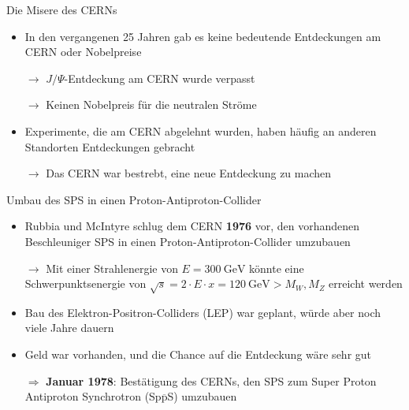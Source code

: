 \documentclass[aspectratio=1610, professionalfonts, 10pt]{beamer}
\begin{document}
\begin{frame}{Die Misere des CERNs}
				\begin{itemize}
					\setlength\itemsep{0.5em}
					\item In den vergangenen 25 Jahren gab es keine bedeutende Entdeckungen am CERN oder Nobelpreise
					\item[$\rightarrow$] $J/\Psi$-Entdeckung am CERN wurde verpasst
					\item[$\rightarrow$] Keinen Nobelpreis für die neutralen Ströme
					\item Experimente, die am CERN abgelehnt wurden, haben häufig an anderen Standorten Entdeckungen gebracht
				\end{itemize}
				\vspace*{10px}
				\begin{itemize}
					\item[$\rightarrow$] Das CERN war bestrebt, eine neue Entdeckung zu machen
				\end{itemize}
\end{frame}

\begin{frame}{Umbau des SPS in einen Proton-Antiproton-Collider}
				\begin{itemize}
					\setlength\itemsep{0.5em}
					\item Rubbia und McIntyre schlug dem CERN \textbf{1976} vor, den vorhandenen Beschleuniger SPS in einen Proton-Antiproton-Collider umzubauen
					\item[$\rightarrow$] Mit einer Strahlenergie von $E = \SI{300}{\giga\electronvolt}$ könnte eine Schwerpunktsenergie von $\sqrt{s} = 2 \cdot E \cdot x = \SI{120}{\giga\electronvolt} > M_W, M_Z$ erreicht werden
					\item Bau des Elektron-Positron-Colliders (LEP) war geplant, würde aber noch viele Jahre dauern
					\item Geld war vorhanden, und die Chance auf die Entdeckung wäre sehr gut
				\end{itemize}
					\vspace*{10px}
				\begin{itemize}
					\item[$\Rightarrow$] \textbf{Januar 1978}: Bestätigung des CERNs, den SPS zum Super Proton Antiproton Synchrotron (Sp$\overline{\text{p}}$S) umzubauen
				\end{itemize}
\end{frame}
\end{document}
